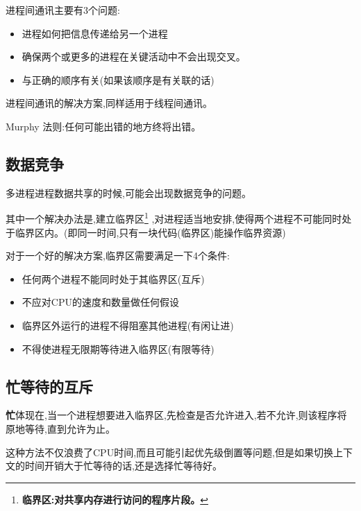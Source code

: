 \documentclass[UTF8,a4paper]{ctexart}
\begin{document}
进程间通讯主要有3个问题:
\begin{itemize}
	\item 进程如何把信息传递给另一个进程
	\item 确保两个或更多的进程在关键活动中不会出现交叉。
	\item 与正确的顺序有关(如果该顺序是有关联的话)
\end{itemize}

进程间通讯的解决方案,同样适用于线程间通讯。

{\color{blue}Murphy 法则:任何可能出错的地方终将出错。}

\subsection{数据竞争}
多进程进程数据共享的时候,可能会出现数据竞争的问题。

其中一个解决办法是,建立临界区\footnote{\textbf{临界区:对共享内存进行访问的程序片段。}}
,对进程适当地安排,使得两个进程不可能同时处于临界区内。(即同一时间,只有一块代码(临界区)能操作临界资源)

对于一个好的解决方案,临界区需要满足一下4个条件:
\begin{itemize}
	\item 任何两个进程不能同时处于其临界区(互斥)
	\item 不应对CPU的速度和数量做任何假设
	\item 临界区外运行的进程不得阻塞其他进程(有闲让进)
	\item 不得使进程无限期等待进入临界区(有限等待)
\end{itemize}

\subsection{忙等待的互斥}
\textbf{忙}体现在,当一个进程想要进入临界区,先检查是否允许进入,若不允许,则该程序将原地等待,直到允许为止。

这种方法不仅浪费了CPU时间,而且可能引起优先级倒置等问题,但是如果切换上下文的时间开销大于忙等待的话,还是选择忙等待好。
\end{document}
